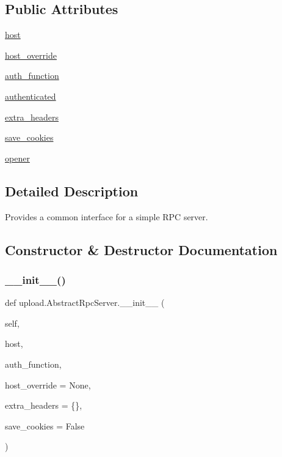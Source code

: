 \subsection*{Public Attributes}
\begin{DoxyCompactItemize}
\item 
\mbox{\hyperlink{classupload_1_1AbstractRpcServer_ab7188d827e2faddcf970f524f5856192}{host}}
\item 
\mbox{\hyperlink{classupload_1_1AbstractRpcServer_a783a4a7e4ffb776a57a3f267300a213b}{host\+\_\+override}}
\item 
\mbox{\hyperlink{classupload_1_1AbstractRpcServer_aee0090a3bcf07b913a7dd596a5dabb8f}{auth\+\_\+function}}
\item 
\mbox{\hyperlink{classupload_1_1AbstractRpcServer_a692955750c802e461c6336d3000cd365}{authenticated}}
\item 
\mbox{\hyperlink{classupload_1_1AbstractRpcServer_adbbf0109afc13d58d7815fa143cb779f}{extra\+\_\+headers}}
\item 
\mbox{\hyperlink{classupload_1_1AbstractRpcServer_affe342205c4647d41b127f5a5634858b}{save\+\_\+cookies}}
\item 
\mbox{\hyperlink{classupload_1_1AbstractRpcServer_aa931446476e0e86f3ade7fef0a0aea5a}{opener}}
\end{DoxyCompactItemize}


\subsection{Detailed Description}
\begin{DoxyVerb}Provides a common interface for a simple RPC server.\end{DoxyVerb}
 

\subsection{Constructor \& Destructor Documentation}
\mbox{\label{classupload_1_1AbstractRpcServer_a3f6bc1bd16b52bd5a5c33a1fedeef2d0}} 
\subsubsection{\texorpdfstring{\_\_init\_\_()}{\_\_init\_\_()}\hspace{0.1cm}{\footnotesize\ttfamily [1/2]}}
{\footnotesize\ttfamily def upload.\+Abstract\+Rpc\+Server.\+\_\+\+\_\+init\+\_\+\+\_\+ (\begin{DoxyParamCaption}\item[{}]{self,  }\item[{}]{host,  }\item[{}]{auth\+\_\+function,  }\item[{}]{host\+\_\+override = {\ttfamily None},  }\item[{}]{extra\+\_\+headers = {\ttfamily \{\}},  }\item[{}]{save\+\_\+cookies = {\ttfamily False} }\end{DoxyParamCaption})}

